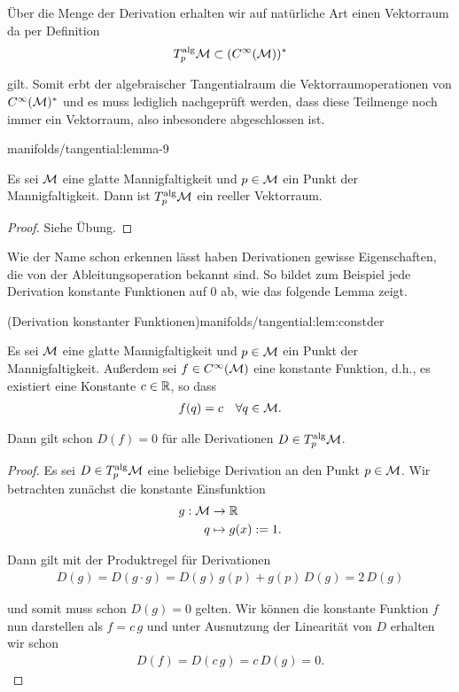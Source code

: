 \par
Über die Menge der Derivation erhalten wir auf natürliche Art einen Vektorraum da per Definition
\begin{align*}
T^{\text{alg}}_p\mathcal{M} \subset (C^\infty(\mathcal{M}))^\ast
\end{align*}
\par
gilt.
Somit erbt der algebraischer Tangentialraum die Vektorraumoperationen von \(C^\infty(\mathcal{M})^\ast\) und es muss lediglich nachgeprüft werden, dass diese Teilmenge noch immer ein Vektorraum, also inbesondere abgeschlossen ist.
\begin{lemma}{}{manifolds/tangential:lemma-9}



\par
Es sei \(\mathcal{M}\) eine glatte Mannigfaltigkeit und \(p\in\mathcal{M}\) ein Punkt der Mannigfaltigkeit.
Dann ist \(T^{\text{alg}}_p\mathcal{M}\) ein reeller Vektorraum.
\end{lemma}

\begin{proof}
 Siehe Übung.
\end{proof}

\par
Wie der Name schon erkennen lässt haben Derivationen gewisse Eigenschaften, die von der Ableitungsoperation bekannt sind.
So bildet zum Beispiel jede Derivation konstante Funktionen auf \(0\) ab, wie das folgende Lemma zeigt.
\begin{lemma}{(Derivation konstanter Funktionen)}{manifolds/tangential:lem:constder}



\par
Es sei \(\mathcal{M}\) eine glatte Mannigfaltigkeit und \(p\in\mathcal{M}\) ein Punkt der Mannigfaltigkeit.
Außerdem sei \(f\in C^\infty(\mathcal{M})\) eine konstante Funktion, d.h., es existiert eine Konstante \(c\in\mathbb{R}\), so dass
\begin{align*}
f(q) = c\quad\forall q\in\mathcal{M}.
\end{align*}
\par
Dann gilt schon \(D(f)=0\) für alle Derivationen \(D\in T^{\text{alg}}_p\mathcal{M}\).
\end{lemma}

\begin{proof}
 Es sei \(D\in T^{\text{alg}}_p\mathcal{M}\) eine beliebige Derivation an den Punkt \(p \in \mathcal{M}\).
Wir betrachten zunächst die konstante Einsfunktion
\begin{align*}
g:\mathcal{M} &\to \mathbb{R}\\
q &\mapsto g(x) := 1.
\end{align*}
\par
Dann gilt mit der Produktregel für Derivationen
\begin{align*}
D(g) = D(g\cdot g) = D(g)\,g(p) + g(p)\, D(g) = 2\,D(g)
\end{align*}
\par
und somit muss schon \(D(g) = 0\) gelten.
Wir können die konstante Funktion \(f\) nun darstellen als \(f= c\,g\) und unter Ausnutzung der Linearität von \(D\) erhalten wir schon
\begin{align*}
D(f) = D(c\,g) = c\,D(g) = 0.
\end{align*}\end{proof}

